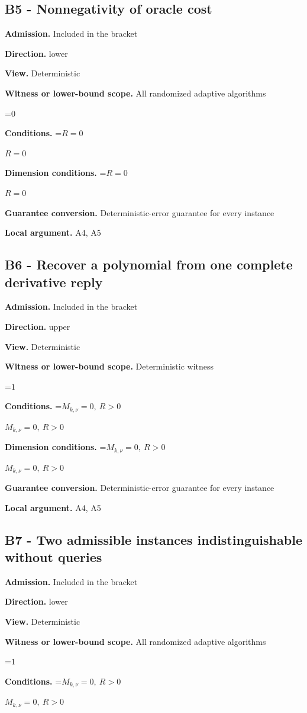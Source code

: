 \documentclass[10pt,a4paper]{article}
\newcommand{\AtlasMath}[1]{\par\begingroup\centering\setbox0=\hbox{$\displaystyle #1$}\ifdim\wd0>1.4\linewidth\typeout{ATLAS WIDE FORMULA: \the\wd0}\fi\ifdim\wd0>\linewidth\resizebox{\linewidth}{!}{\box0}\else\box0\fi\par\endgroup}
\newcommand{\AtlasInlineMath}[1]{\begingroup\setbox0=\hbox{$#1$}\ifdim\wd0>.4\linewidth\endgroup\AtlasMath{#1}\else\endgroup$#1$\fi}
\begin{document}
\subsection{B5 - Nonnegativity of oracle cost}
\textbf{Admission.} Included in the bracket

\textbf{Direction.} lower

\textbf{View.} Deterministic

\textbf{Witness or lower-bound scope.} All randomized adaptive algorithms

\AtlasMath{0}
\textbf{Conditions.} \AtlasInlineMath{R=0}

\textbf{Dimension conditions.} \AtlasInlineMath{R=0}

\textbf{Guarantee conversion.} Deterministic-error guarantee for every instance

\textbf{Local argument.} A4, A5

\subsection{B6 - Recover a polynomial from one complete derivative reply}
\textbf{Admission.} Included in the bracket

\textbf{Direction.} upper

\textbf{View.} Deterministic

\textbf{Witness or lower-bound scope.} Deterministic witness

\AtlasMath{1}
\textbf{Conditions.} \AtlasInlineMath{M_{k,\nu}=0,\ R>0}

\textbf{Dimension conditions.} \AtlasInlineMath{M_{k,\nu}=0,\ R>0}

\textbf{Guarantee conversion.} Deterministic-error guarantee for every instance

\textbf{Local argument.} A4, A5

\subsection{B7 - Two admissible instances indistinguishable without queries}
\textbf{Admission.} Included in the bracket

\textbf{Direction.} lower

\textbf{View.} Deterministic

\textbf{Witness or lower-bound scope.} All randomized adaptive algorithms

\AtlasMath{1}
\textbf{Conditions.} \AtlasInlineMath{M_{k,\nu}=0,\ R>0}
\end{document}
